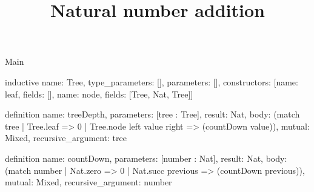 \begin{lexlean}{Main}
\title{Natural number addition}
\begin{semanticmodule}
inductive{
  name: Tree,
  type_parameters: [],
  parameters: [],
  constructors: [{name: leaf, fields: []}, {name: node, fields: [Tree, Nat, Tree]}]
}

definition{
  name: treeDepth,
  parameters: [tree : Tree],
  result: Nat,
  body: (match tree | Tree.leaf => 0 | Tree.node left value right => (countDown value)),
  mutual: Mixed,
  recursive_argument: tree
}

definition{
  name: countDown,
  parameters: [number : Nat],
  result: Nat,
  body: (match number | Nat.zero => 0 | Nat.succ previous => (countDown previous)),
  mutual: Mixed,
  recursive_argument: number
}
\end{semanticmodule}
\end{lexlean}
